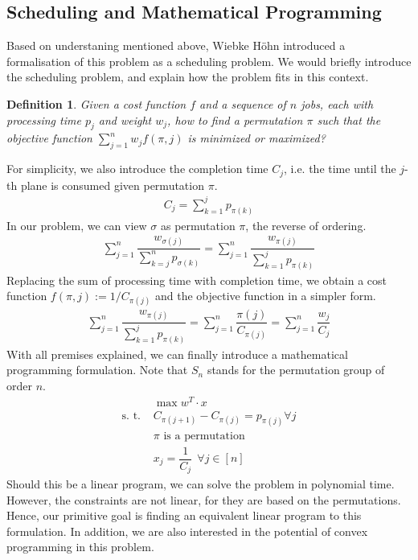 \documentclass[12pt,letterpaper]{article}
\newtheorem{definition}[theorem]{Definition}
\begin{document}
\subsection{Scheduling and Mathematical Programming}
Based on understaning mentioned above, Wiebke Höhn introduced a formalisation of this problem as a scheduling problem. \cite{hohn2015performance}
We would briefly introduce the scheduling problem, and explain how the problem fits in this context. 
\begin{definition}
    Given a cost function $f$ and a sequence of $n$ jobs, each with processing time $p_j$ and weight $w_j$, how to find a permutation $\pi$
    such that the objective function $\sum_{j = 1}^{n} w_j f(\pi, j)$ is minimized or maximized? 
\end{definition}
For simplicity, we also introduce the completion time $C_j$, i.e. the time until the $j$-th plane is consumed given permutation $\pi$.
\begin{align*}
    C_j = \sum_{k = 1}^j p_{\pi(k)}
\end{align*}
In our problem, we can view $\sigma$ as permutation $\pi$, the reverse of ordering.
\begin{align*}
    \sum_{j=1}^{n} \dfrac{w_{\sigma(j)}}{\sum_{k = j}^n p_{\sigma(k)}} = \sum_{j = 1}^n \dfrac{w_{\pi(j)}}{\sum_{k = 1}^j p_{\pi(k)}}
\end{align*}
Replacing the sum of processing time with completion time, we obtain a cost function $f(\pi, j) := 1 / C_{\pi(j)}$
and the objective function in a simpler form.
\begin{align*}
    \sum_{j = 1}^n \dfrac{w_{\pi(j)}}{\sum_{k = 1}^j p_{\pi(k)}} = \sum_{j = 1}^n \dfrac{\pi(j)}{C_{\pi(j)}} =  \sum_{j = 1}^n \dfrac{w_{j}}{C_j}
\end{align*}
With all premises explained, we can finally introduce a mathematical programming formulation. Note that $S_n$ stands for the permutation group of order $n$. 
\begin{align*}
    &\max w^T \cdot x \label{eq:linobj} \tag{A} \\ 
    \text{s. t.\ }& C_{\pi(j+1)} - C_{\pi(j)} = p_{\pi(j)} \forall j \\
    & \pi \text{ is a permutation} \\ 
    & x_j = \dfrac{1}{C_j} \ \ \forall j \in [n] 
\end{align*}
Should this be a linear program, we can solve the problem in polynomial time. 
However, the constraints are not linear, for they are based on the permutations.
Hence, our primitive goal is finding an equivalent linear program to this formulation. In addition, 
we are also interested in the potential of convex programming in this problem. 
\end{document}
